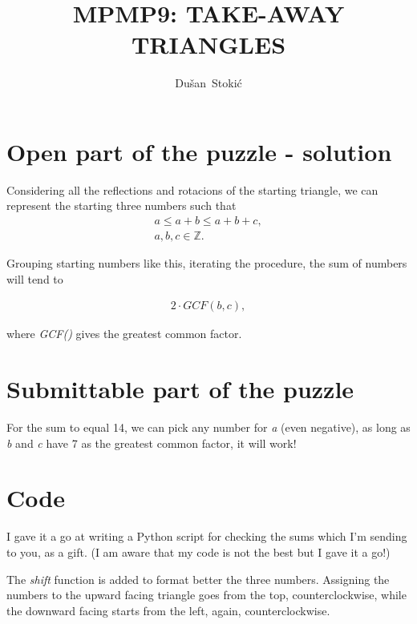 \documentclass[a4paper,12pt]{article}
\title{MPMP9: TAKE-AWAY TRIANGLES}
\author{Dušan~Stokić}
\date{}
\begin{document}
\maketitle

\section{Open part of the puzzle - solution}
Considering all the reflections and rotacions of the starting triangle, we can represent the starting three numbers such that
\begin{gather}
a \leq a+b \leq a+b+c  ,\label{eq:S}\\
 a,b,c \in \mathbb{Z}.
\end{gather}

Grouping starting numbers like this, iterating the procedure, the sum of numbers will tend to

\begin{gather}
2 \cdot GCF\left(b,c\right),\label{eq:S}
\end{gather}

where \emph{GCF()} gives the greatest common factor.

\section{Submittable part of the puzzle}

For the sum to equal 14, we can pick any number for \emph{a} (even negative), as long as \emph{b} and \emph{c} have 7 as the greatest common factor, it will work!

\section{Code}

I gave it a go at writing a Python script for checking the sums which I'm sending to you, as a gift. 
(I am aware that my code is not the best but I gave it a go!)

The \emph{shift} function is added to format better the three numbers. Assigning the numbers to the upward facing triangle goes from the top, counterclockwise, while the downward facing starts from the left, again, counterclockwise.
\end{document}
